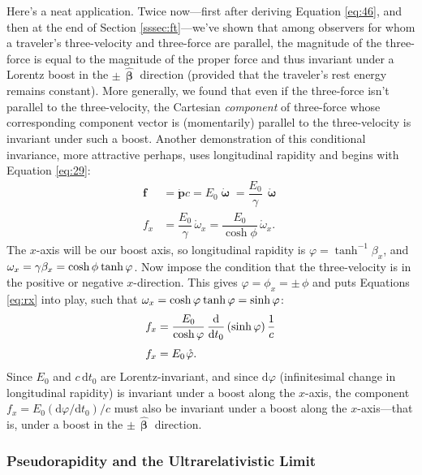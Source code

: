 \documentclass[12pt]{article}
\renewcommand{\vv}[1]{\mathbf{#1}}
\newcommand{\dd}[1]{\mathrm{d}#1}
\newcommand{\hatbeta}{\bm{\hat{\upbeta}}}
\newcommand{\vvomega}{\bm{\upomega}}
\begin{document}
Here's a neat application. Twice now---first after deriving Equation \ref{eq:46}, and then at the end of Section \ref{sssec:ft}---we've shown that among observers for whom a traveler's three-velocity and three-force are parallel, the magnitude of the three-force is equal to the magnitude of the proper force and thus invariant under a Lorentz boost in the $\pm \, \hatbeta$ direction (provided that the traveler's rest energy remains constant). More generally, we found that even if the three-force isn't parallel to the three-velocity, the Cartesian \emph{component} of three-force whose corresponding component vector is (momentarily) parallel to the three-velocity is invariant under such a boost. Another demonstration of this conditional invariance, more attractive perhaps, uses longitudinal rapidity and begins with Equation \ref{eq:29}:
\begin{equation*}
\begin{split}
\vv f &= \dot{\vv p} c = E_0 \dot{\vvomega} =  \dfrac{E_0}{\gamma} \, \mathring{\vvomega} \\[3pt]
f_x & = \dfrac{E_0}{\gamma} \, \mathring{\omega}_x = \dfrac{E_0}{\cosh{\phi}} \, \mathring{\omega}_x .
\end{split}
\end{equation*}
The $x$-axis will be our boost axis, so longitudinal rapidity is $\varphi = \tanh^{-1}{\beta_x}$, and $\omega_x = \gamma \beta_x = \cosh{\phi} \mkern1mu \tanh{\varphi}$. Now impose the condition that the three-velocity is in the positive or negative $x$-direction. This gives $\varphi = \phi_x = \pm \, \phi$ and puts Equations \ref{eq:rx} into play, such that $\omega_x = \cosh{\varphi} \mkern1mu \tanh{\varphi} = \sinh{\varphi}$:
\begin{equation*}
\begin{split}
f_x &= \dfrac{E_0}{\cosh{\varphi}} \, \dfrac{\dd}{\dd t_0} \left( \sinh{\varphi} \right) \dfrac{1}{c}  \\[3pt]
f_x &= E_0 \mkern1.5mu \mathring{\varphi} .
\end{split}
\end{equation*}
Since $E_0$ and $c \, \dd t_0$ are Lorentz-invariant, and since $\dd \varphi$ (infinitesimal change in longitudinal rapidity) is invariant under a boost along the $x$-axis, the component $f_x = E_0 (\dd \varphi / \dd t_0) / c$ must also be invariant under a boost along the $x$-axis---that is, under a boost in the $\pm \, \hatbeta$ direction.


\subsubsection{Pseudorapidity and the Ultrarelativistic Limit}
\end{document}
